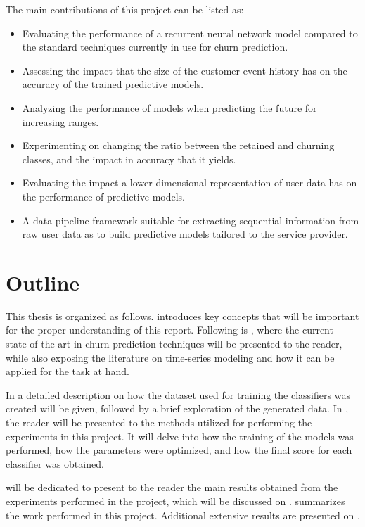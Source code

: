 \documentclass{kththesis}
\begin{document}
The main contributions of this project can be listed as:

\begin{itemize}
\item Evaluating the performance of a recurrent neural network model compared to the standard techniques currently in use for churn prediction.
\item Assessing the impact that the size of the customer event history has on the accuracy of the trained predictive models.
\item Analyzing the performance of models when predicting the future for increasing ranges.
\item Experimenting on changing the ratio between the retained and churning classes, and the impact in accuracy that it yields.
\item Evaluating the impact a lower dimensional representation of user data has on the performance of predictive models.
\item A data pipeline framework suitable for extracting sequential information from raw user data as to build predictive models tailored to the service provider.
\end{itemize}

\section{Outline}

This thesis is organized as follows.  introduces key concepts that will be important for the proper understanding of this report. Following is , where the current state-of-the-art in churn prediction techniques will be presented to the reader, while also exposing the literature on time-series modeling and how it can be applied for the task at hand. 

In  a detailed description on how the dataset used for training the classifiers was created will be given, followed by a brief exploration of the generated data. In , the reader will be presented to the methods utilized for performing the experiments in this project. It will delve into how the training of the models was performed, how the parameters were optimized, and how the final score for each classifier was obtained.

 will be dedicated to present to the reader the main results obtained from the experiments performed in the project, which will be discussed on .  summarizes the work performed in this project. Additional extensive results are presented on . 
\end{document}
